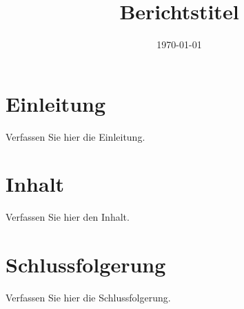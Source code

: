 \documentclass{report}
\title{Berichtstitel}
\author{}
\date{\today}
\begin{document}
\maketitle

\chapter{Einleitung}
Verfassen Sie hier die Einleitung.

\chapter{Inhalt}
Verfassen Sie hier den Inhalt.

\chapter{Schlussfolgerung}
Verfassen Sie hier die Schlussfolgerung.
\end{document}
